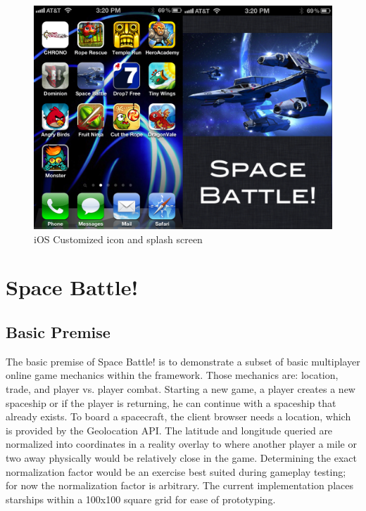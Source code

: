 \documentclass[12pt]{report}	%
\theoremstyle{definition}
\theoremstyle{remark}
\begin{document}
\begin{figure}[h!]
\centering
\includegraphics[scale=0.35]{2.png}
\caption{iOS Customized icon and splash screen}
\label{ioscustom}
\end{figure}

\chapter{Space Battle!}

\section{Basic Premise}

The basic premise of Space Battle! is to demonstrate a subset of basic
multiplayer online game mechanics within the framework. Those mechanics
are: location, trade, and player vs. player combat. Starting a new game,
a player creates a new spaceship or if the player is returning, he can continue with a
spaceship that already exists. To board a spacecraft, the client
browser needs a location, which is provided by the Geolocation API. The
latitude and longitude queried are normalized into coordinates in a
reality overlay to where another player a mile or two away physically
would be relatively close in the game. Determining the exact
normalization factor would be an exercise best suited during gameplay
testing; for now the normalization factor is arbitrary.
The current implementation places starships within a 100x100 square grid
for ease of prototyping.
\end{document}
